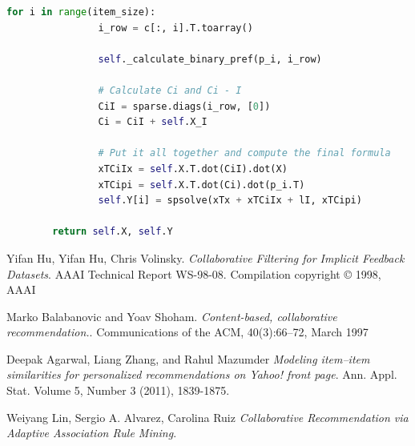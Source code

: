 \documentclass[12pt]{article}
\begin{document}
\begin{lstlisting}[language=Python]
            for i in range(item_size):
                i_row = c[:, i].T.toarray()

                self._calculate_binary_pref(p_i, i_row)

                # Calculate Ci and Ci - I
                CiI = sparse.diags(i_row, [0])
                Ci = CiI + self.X_I

                # Put it all together and compute the final formula
                xTCiIx = self.X.T.dot(CiI).dot(X)
                xTCipi = self.X.T.dot(Ci).dot(p_i.T)
                self.Y[i] = spsolve(xTx + xTCiIx + lI, xTCipi)

        return self.X, self.Y

\end{lstlisting}




\begin{thebibliography}{9}
Yifan Hu, Yifan Hu,  Chris Volinsky. 
\textit{Collaborative Filtering for Implicit Feedback Datasets}. 
AAAI Technical Report WS-98-08. Compilation copyright © 1998, AAAI 

Marko Balabanovic and Yoav Shoham. 
\textit{Content-based, collaborative recommendation.}. 
Communications of the ACM, 40(3):66–72, March 1997


Deepak Agarwal, Liang Zhang, and Rahul Mazumder 
\textit{Modeling item–item similarities for personalized recommendations on Yahoo! front page}. 
Ann. Appl. Stat. Volume 5, Number 3 (2011), 1839-1875.


Weiyang Lin, Sergio A. Alvarez,  Carolina Ruiz
\textit{Collaborative Recommendation via Adaptive Association Rule Mining}. 

 \end{thebibliography}
\end{document}
